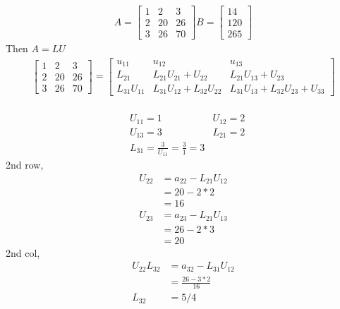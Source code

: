\documentclass{report}
\begin{document}
{    \begin{align*}
        A = \begin{bmatrix}
            1&2&3\\
            2&20&26\\
            3&26&70
        \end{bmatrix}
        B = \begin{bmatrix}
            14\\120\\265
        \end{bmatrix}
    \end{align*}
    Then $A = LU$
    \begin{align*}
        \begin{bmatrix}
                1&2&3\\
                2&20&26\\
                3&26&70
            \end{bmatrix} = 
            \begin{bmatrix}
                u_{11}& u_{12}& u_{13}\\
                L_{21}& L_{21}U_{21} +U_{22}& L_{21}U_{13} + U_{23}\\
                L_{31}U_{11}& L_{31}U_{12} +L_{32}U_{22}& L_{31}U_{13} + L_{32}U_{23}+U_{33}                
            \end{bmatrix} \\ 
    \end{align*}

    \begin{align*}
            &U_{11} = 1 &  U_{12} = 2\\
            &U_{13} = 3 & L_{21} = 2\\
            &L_{31} = \frac{3}{U_{11}} = \frac{3}{1} =3 
        \end{align*}
        2nd row,
        \begin{align*}
            U_{22} & = a_{22} - L_{21}U_{12}\\
            & = 20 - 2*2\\
            & = 16\\
            U_{23} & = a_{23} - L_{21}U_{13}\\
            & = 26 - 2*3\\
            & = 20
        \end{align*}
        2nd col,
        \begin{align*}
            U_{22}L_{32} & = a_{32} - L_{31}U_{12}\\
            & = \frac{26- 3*2}{16}\\
            L_{32}& = 5/4\\       
        \end{align*}

}
\end{document}
